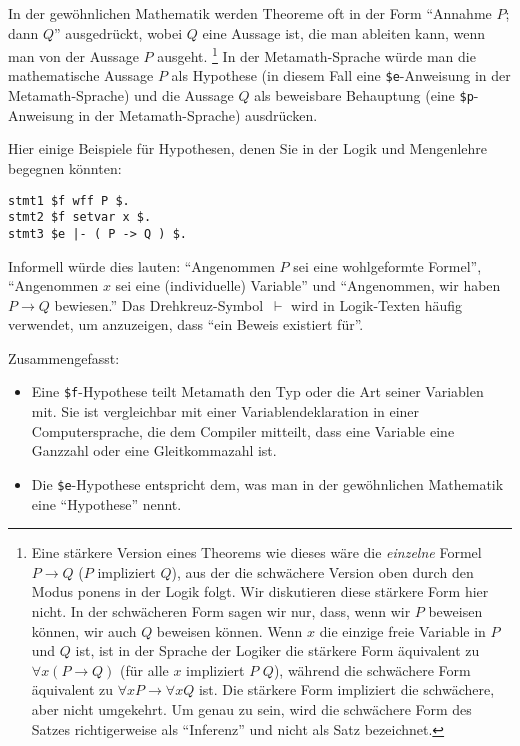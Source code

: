 In der gewöhnlichen Mathematik werden Theoreme oft in der Form "`Annahme $P$; dann $Q$"' ausgedrückt, wobei $Q$ eine Aussage ist, die man ableiten kann, wenn man von der Aussage $P$ ausgeht.
\footnote{Eine stärkere Version eines Theorems wie dieses wäre die {\em einzelne} Formel $P\rightarrow Q$ ($P$ impliziert $Q$), aus der die schwächere Version oben durch den Modus ponens in der Logik folgt.
Wir diskutieren diese stärkere Form hier nicht.  In der schwächeren Form sagen wir nur, dass, wenn wir $P$ beweisen können, wir auch $Q$ beweisen können.
Wenn $x$ die einzige freie Variable in $P$ und $Q$ ist, ist in der Sprache der Logiker die stärkere Form äquivalent zu $\forall x ( P \rightarrow Q)$ (für alle $x$ impliziert $P$ $Q$), während die schwächere Form äquivalent zu $\forall x P \rightarrow \forall x Q$ ist. Die stärkere Form impliziert die schwächere, aber nicht umgekehrt.
Um genau zu sein, wird die schwächere Form des Satzes richtigerweise als "`Inferenz"' und nicht als Satz bezeichnet.}
In der Metamath-Sprache würde man die mathematische Aussage $P$ als Hypothese (in diesem Fall eine \texttt{\$e}-Anweisung in der Metamath-Sprache) und die Aussage $Q$ als beweisbare Behauptung (eine \texttt{\$p}-Anweisung in der Metamath-Sprache) ausdrücken.

Hier einige Beispiele für Hypothesen, denen Sie in der Logik und Mengenlehre begegnen könnten:
\begin{center}
	\texttt{stmt1 \$f wff P \$.}\\
	\texttt{stmt2 \$f setvar x \$.}\\
	\texttt{stmt3 \$e |- ( P -> Q ) \$.}
\end{center}

Informell würde dies lauten: "`Angenommen $P$ sei eine wohlgeformte Formel"', "`Angenommen $x$ sei eine (individuelle) Variable"' und "`Angenommen, wir haben $P \rightarrow Q$ bewiesen."'  Das Drehkreuz-Symbol \,$\vdash$ wird in Logik-Texten häufig verwendet, um anzuzeigen, dass "`ein Beweis existiert für"'.

Zusammengefasst:
\begin{itemize}
\item Eine \texttt{\$f}-Hypothese teilt Metamath den Typ oder die Art seiner Variablen mit. Sie ist vergleichbar mit einer Variablendeklaration in einer Computersprache, die dem Compiler mitteilt, dass eine Variable eine Ganzzahl oder eine Gleitkommazahl ist.
\item Die \texttt{\$e}-Hypothese entspricht dem, was man in der gewöhnlichen Mathematik eine "`Hypothese"' nennt.
\end{itemize}

